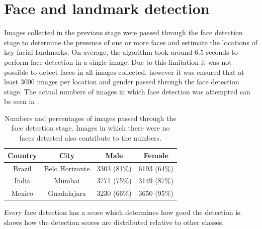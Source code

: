 \section{Face and landmark detection}
\label{results:fd}
Images collected in the previous stage were passed through the face detection
stage to determine the presence of one or more faces and estimate the locations
of key facial landmarks. On average, the algorithm took around $6.5$ seconds to
perform face detection in a single image. Due to this limitation it was not
possible to detect faces in all images collected, however it was ensured that
at least 3000 images per location and gender passed through the face detection
stage. The actual numbers of images in which face detection was attempted can
be seen in .
\begin{table}[t]
    \begin{center}
        \begin{tabular}{ c c c c}
            \toprule
            Country       & City              & Male   & Female\\ 
            \toprule
            Brazil  & Belo Horizonte &  3303 (81\%) & 6193 (64\%)\\
            India   & Mumbai         &  3771 (75\%) & 3149 (87\%)\\
            Mexico  & Guadalajara    &  3230 (66\%) & 3650 (95\%)\\
            \bottomrule
        \end{tabular}
    \end{center}
    \caption{Numbers and percentages of images passed through the face
    detection stage. Images in which there were no faces detected also
contribute to the numbers.}
    \label{table:results:fd:detected}
\end{table}

Every face detection has a score which determines how good the detection is.
 shows how the detection scores are
distributed relative to other classes.

